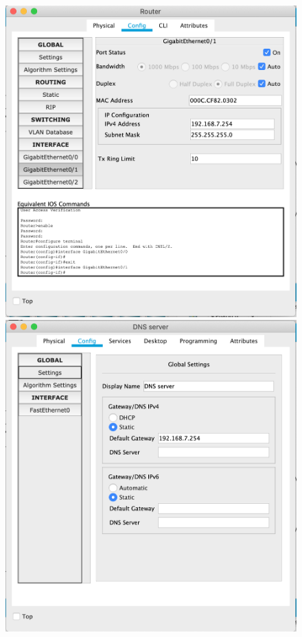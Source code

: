 \documentclass[a4paper,12pt]{article}
\begin{document}
	\begin{figure}[h!]
		\begin{minipage}[b]{0.32\textwidth}
			\includegraphics[width=\textwidth]{6.1.png}
		\end{minipage}
		\begin{minipage}[b]{0.32\textwidth}
			\includegraphics[width=\textwidth]{6.2.png}
		\end{minipage}
		\label{ris:6}
	\end{figure}
\end{document}
